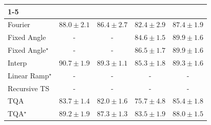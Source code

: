 \begin{tabular}{l|cccc|}
\cline{1-5}
\multicolumn{5}{c}{\rule{0pt}{8pt}PP} \\
\midrule
Fourier & {\cellcolor[HTML]{1A7D40}} \color[HTML]{F1F1F1} $88.0\pm 2.1$ & {\cellcolor[HTML]{2C8F4B}} \color[HTML]{F1F1F1} $86.4\pm 2.7$ & {\cellcolor[HTML]{61BB6D}} \color[HTML]{F1F1F1} $82.4\pm 2.9$ & {\cellcolor[HTML]{218242}} \color[HTML]{F1F1F1} $87.4\pm 1.9$ \\
Fixed Angle & {\cellcolor[HTML]{000000}} \color[HTML]{F1F1F1} {\cellcolor{white}} \color{black} - & {\cellcolor[HTML]{000000}} \color[HTML]{F1F1F1} {\cellcolor{white}} \color{black} - & {\cellcolor[HTML]{3DA559}} \color[HTML]{F1F1F1} $84.6\pm 1.5$ & {\cellcolor[HTML]{056C39}} \color[HTML]{F1F1F1} $89.9\pm 1.6$ \\
Fixed Angle$^\star$ & {\cellcolor[HTML]{000000}} \color[HTML]{F1F1F1} {\cellcolor{white}} \color{black} - & {\cellcolor[HTML]{000000}} \color[HTML]{F1F1F1} {\cellcolor{white}} \color{black} - & {\cellcolor[HTML]{2B8E4A}} \color[HTML]{F1F1F1} $86.5\pm 1.7$ & {\cellcolor[HTML]{056C39}} \color[HTML]{F1F1F1} $89.9\pm 1.6$ \\
Interp & {\cellcolor[HTML]{006435}} \color[HTML]{F1F1F1} $90.7\pm 1.9$ & {\cellcolor[HTML]{0B713B}} \color[HTML]{F1F1F1} $89.3\pm 1.1$ & {\cellcolor[HTML]{369D54}} \color[HTML]{F1F1F1} $85.3\pm 1.8$ & {\cellcolor[HTML]{0B713B}} \color[HTML]{F1F1F1} $89.3\pm 1.6$ \\
Linear Ramp$^\star$ & {\cellcolor[HTML]{000000}} \color[HTML]{F1F1F1} {\cellcolor{white}} \color{black} - & {\cellcolor[HTML]{000000}} \color[HTML]{F1F1F1} {\cellcolor{white}} \color{black} - & {\cellcolor[HTML]{000000}} \color[HTML]{F1F1F1} {\cellcolor{white}} \color{black} - & {\cellcolor[HTML]{000000}} \color[HTML]{F1F1F1} {\cellcolor{white}} \color{black} - \\
Recursive TS & {\cellcolor[HTML]{000000}} \color[HTML]{F1F1F1} {\cellcolor{white}} \color{black} - & {\cellcolor[HTML]{000000}} \color[HTML]{F1F1F1} {\cellcolor{white}} \color{black} - & {\cellcolor[HTML]{000000}} \color[HTML]{F1F1F1} {\cellcolor{white}} \color{black} - & {\cellcolor[HTML]{000000}} \color[HTML]{F1F1F1} {\cellcolor{white}} \color{black} - \\
TQA & {\cellcolor[HTML]{4AB062}} \color[HTML]{F1F1F1} $83.7\pm 1.4$ & {\cellcolor[HTML]{69BF72}} \color[HTML]{000000} $82.0\pm 1.6$ & {\cellcolor[HTML]{CFEC9E}} \color[HTML]{000000} $75.7\pm 4.8$ & {\cellcolor[HTML]{359C53}} \color[HTML]{F1F1F1} $85.4\pm 1.8$ \\
TQA$^\star$ & {\cellcolor[HTML]{0C723B}} \color[HTML]{F1F1F1} $89.2\pm 1.9$ & {\cellcolor[HTML]{228343}} \color[HTML]{F1F1F1} $87.3\pm 1.3$ & {\cellcolor[HTML]{4EB163}} \color[HTML]{F1F1F1} $83.5\pm 1.9$ & {\cellcolor[HTML]{1A7D40}} \color[HTML]{F1F1F1} $88.0\pm 1.5$ \\

\end{tabular}

